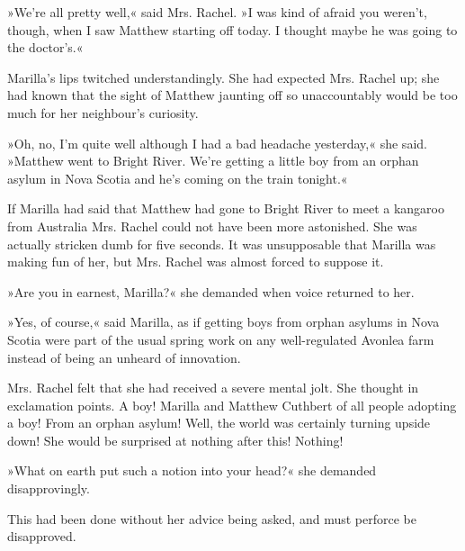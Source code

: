 »We're all pretty well,« said Mrs. Rachel. »I was kind of afraid you weren't, though, when I saw Matthew starting off today. I thought maybe he was going to the doctor's.«

Marilla's lips twitched understandingly. She had expected Mrs. Rachel up; she had known that the sight of Matthew jaunting off so unaccountably would be too much for her neighbour's curiosity.

»Oh, no, I'm quite well although I had a bad headache yesterday,« she said. »Matthew went to Bright River. We're getting a little boy from an orphan asylum in Nova Scotia and he's coming on the train tonight.«

If Marilla had said that Matthew had gone to Bright River to meet a kangaroo from Australia Mrs. Rachel could not have been more astonished. She was actually stricken dumb for five seconds. It was unsupposable that Marilla was making fun of her, but Mrs. Rachel was almost forced to suppose it.

»Are you in earnest, Marilla?« she demanded when voice returned to her.

»Yes, of course,« said Marilla, as if getting boys from orphan asylums in Nova Scotia were part of the usual spring work on any well-regulated Avonlea farm instead of being an unheard of innovation.

Mrs. Rachel felt that she had received a severe mental jolt. She thought in exclamation points. A boy! Marilla and Matthew Cuthbert of all people adopting a boy! From an orphan asylum! Well, the world was certainly turning upside down! She would be surprised at nothing after this! Nothing!

»What on earth put such a notion into your head?« she demanded disapprovingly.

This had been done without her advice being asked, and must perforce be disapproved.


